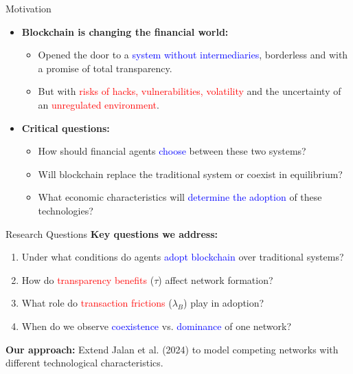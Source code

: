 \documentclass{beamer}
\begin{document}
\begin{frame}{Motivation}
\begin{itemize}
   \item \textbf{Blockchain is changing the financial world:}
   \begin{itemize}
       \item Opened the door to a \textcolor{blue}{system without intermediaries}, borderless and with a promise of total transparency.
       \item But with \textcolor{red}{risks of hacks, vulnerabilities, volatility} and the uncertainty of an \textcolor{red}{unregulated environment}.
   \end{itemize}
   
   \vspace{0.5cm}
   \item \textbf{Critical questions:}
   \begin{itemize}
  \item How should financial agents \textcolor{blue}{choose} between these two systems?
     \vspace{0.3cm}
   \item Will blockchain replace the traditional system or coexist in equilibrium?
   
   \vspace{0.3cm}
   
   \item What economic characteristics will \textcolor{blue}{determine the adoption} of these technologies?
   \end{itemize}
\end{itemize}
\end{frame}

\begin{frame}{Research Questions}
\textbf{Key questions we address:}
\begin{enumerate}
    \item Under what conditions do agents \textcolor{blue}{adopt blockchain} over traditional systems?
    \item How do \textcolor{red}{transparency benefits} ($\tau$) affect network formation?
    \item What role do \textcolor{red}{transaction frictions} ($\lambda_B$) play in adoption?
    \item When do we observe \textcolor{blue}{coexistence} vs. \textcolor{blue}{dominance} of one network?
\end{enumerate}

\vspace{0.3cm}
\textbf{Our approach:} Extend Jalan et al. (2024) to model competing networks with different technological characteristics.
\end{frame}
\end{document}
